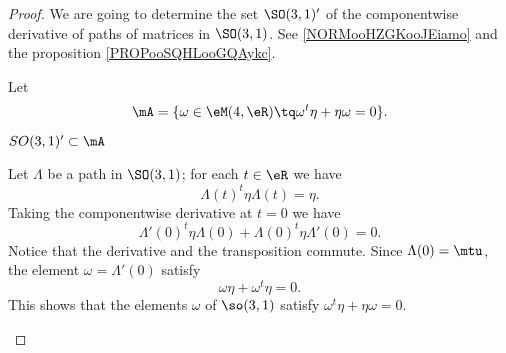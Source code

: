 \begin{proof}
    We are going to determine the set \( \SO(3,1)'\) of the componentwise derivative of paths of matrices in \( \SO(3,1)\). See \ref{NORMooHZGKooJEiamo} and the proposition \ref{PROPooSQHLooGQAykc}.

    Let 
    \begin{equation}
        \mA=\{ \omega\in\eM(4,\eR)\tq \omega^t\eta+\eta\omega=0 \}.
    \end{equation}

    \begin{subproof}
        \item[\( SO(3,1)'\subset \mA\)]

        Let \( \Lambda\) be a path in \( \SO(3,1)\); for each \( t\in \eR\) we have
        \begin{equation}
            \Lambda(t)^t\eta\Lambda(t)=\eta.
        \end{equation}
        Taking the componentwise derivative at \( t=0\) we have
        \begin{equation}
            \Lambda'(0)^t\eta\Lambda(0)+\Lambda(0)^t\eta\Lambda'(0)=0.
        \end{equation}
        Notice that the derivative and the transposition commute. Since \( \Lambda(0)=\mtu\), the element \( \omega=\Lambda'(0)\) satisfy
        \begin{equation}
            \omega\eta+\omega^t\eta=0.
        \end{equation}
        This shows that the elements \( \omega\) of \( \so(3,1)\) satisfy \( \omega^t\eta+\eta\omega=0\).


\end{subproof}
\end{proof}
